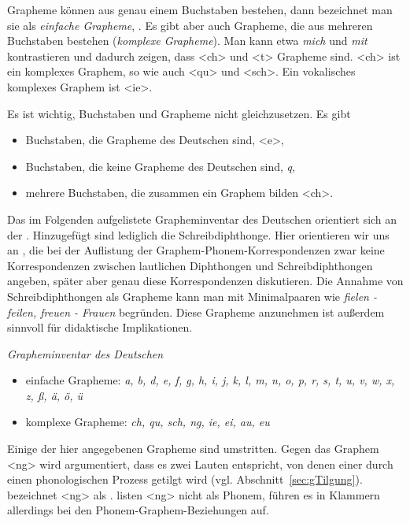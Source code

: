 Grapheme können aus genau einem Buchstaben bestehen, dann bezeichnet man sie als \textit{einfache Grapheme}, . Es gibt aber auch Grapheme, die aus mehreren Buchstaben bestehen (\textit{komplexe Grapheme}). Man kann etwa \textit{mich} und \textit{mit} kontrastieren und dadurch zeigen, dass <ch> und <t> Grapheme sind. <ch> ist ein komplexes Graphem, so wie auch <qu> und <sch>. Ein vokalisches komplexes Graphem ist <ie>.


Es ist wichtig, Buchstaben und Grapheme nicht gleichzusetzen. Es gibt
\begin{itemize}
    \item Buchstaben, die Grapheme des Deutschen sind, \zB <e>,
    \item Buchstaben, die keine Grapheme des Deutschen sind, \zB \textit{q},
    \item mehrere Buchstaben, die zusammen ein Graphem bilden \zB <ch>.
\end{itemize}


Das im Folgenden aufgelistete Grapheminventar des Deutschen orientiert sich an der \citet[909f]{Duden2022}. Hinzugefügt sind lediglich die Schreibdiph\-thonge. Hier orientieren wir uns an \citet[210, 222]{FuhrhopPeters2013}, die bei der Auflistung der Graphem-Phonem-Korrespondenzen zwar keine Korrespondenzen zwischen lautlichen Diphthongen und Schreibdiphthongen angeben, später aber genau diese Korrespondenzen diskutieren. Die Annahme von Schreibdiphthongen als Grapheme kann man mit Minimalpaaren wie \textit{fielen - feilen, freuen - Frauen} begründen. Diese Grapheme anzunehmen ist außerdem sinnvoll für didaktische Implikationen.


\ea
\textit{Grapheminventar des Deutschen}\\
    \begin{itemize}
        \item einfache Grapheme: \textit{a, b, d, e, f, g, h, i, j, k, l, m, n, o, p, r, s, t, u, v, w, x, z, ß, ä, ö, ü}
        \item komplexe Grapheme: \textit{ch, qu, sch, ng, ie, ei, au, eu}
    \end{itemize}
\z



Einige der hier angegebenen Grapheme sind umstritten. Gegen das Graphem <ng> wird argumentiert, dass es zwei Lauten entspricht, von denen einer durch einen phonologischen Prozess getilgt wird (vgl. Abschnitt~\ref{sec:gTilgung}). \citet[94--97]{Nerius1989} bezeichnet <ng> als . \citet[209]{FuhrhopPeters2013} listen <ng> nicht als Phonem, führen es in Klammern allerdings bei den Phonem-Graphem-Beziehungen auf.  

